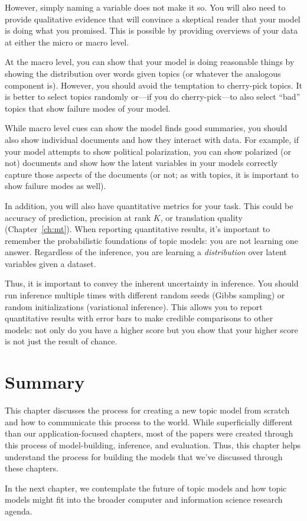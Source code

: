 However, simply naming a variable does not make it so.  You will also
need to provide qualitative evidence that will convince a skeptical
reader that your model is doing what you promised.  This is possible
by providing overviews of your data at either the micro or macro
level.

At the macro level, you can show that your model is doing reasonable
things by showing the distribution over words given topics (or
whatever the analogous component is).  However, you should avoid the
temptation to cherry-pick topics.  It is better to select topics
randomly or---if you do cherry-pick---to also select ``bad'' topics
that show failure modes of your model.

While macro level cues can show the model finds good summaries, you
should also show individual documents and how they interact with
data.  For example, if your model attempts to show political
polarization, you can show polarized (or not) documents and show how
the latent variables in your models correctly capture those aspects of
the documents (or not; as with topics, it is important to show failure
modes as well).

In addition, you will also have quantitative metrics for your task.
This could be accuracy of prediction, precision at rank $K$, or
translation quality (Chapter~\ref{ch:mt}).  When reporting quantitative
results, it's important to remember the probabilistic foundations of
topic models: you are not learning one answer.  Regardless of the
inference, you are learning a \emph{distribution} over latent
variables given a dataset.

Thus, it is important to convey the inherent uncertainty in inference.
You should run inference multiple times with different random seeds
(Gibbs sampling) or random initializations (variational inference).
This allows you to report quantitative results with error bars to make
credible comparisons to other models: not only do you have a higher
score but you show that your higher score is not just the result of
chance.

\section{Summary}

This chapter discusses the process for creating a new topic
model from scratch and how to communicate this process to the world.
While superficially different than our application-focused chapters,
most of the papers were created through this process of
model-building, inference, and evaluation.  Thus, this chapter helps
understand the process for building the models that we've discussed
through these chapters.

In the next chapter, we contemplate the future of topic models and how
topic models might fit into the broader computer and information
science research agenda.

